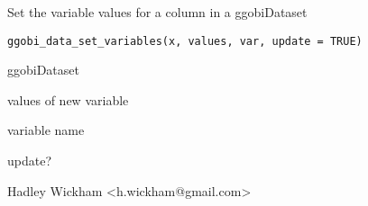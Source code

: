 \begin{Description}\relax
Set the variable values for a column in a ggobiDataset
\end{Description}
\begin{Usage}
\begin{verbatim}ggobi_data_set_variables(x, values, var, update = TRUE)\end{verbatim}
\end{Usage}
\begin{Arguments}
\begin{ldescription}
\item[\code{x}] ggobiDataset
\item[\code{values}] values of new variable
\item[\code{var}] variable name
\item[\code{update}] update?
\end{ldescription}
\end{Arguments}
\begin{Details}\relax
\end{Details}
\begin{Author}\relax
Hadley Wickham <h.wickham@gmail.com>
\end{Author}
\begin{Examples}
\begin{ExampleCode}\end{ExampleCode}
\end{Examples}

